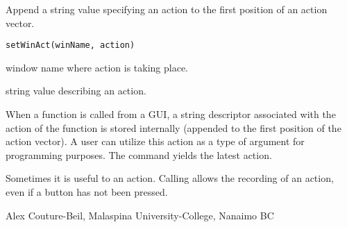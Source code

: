 \documentclass[letterpaper]{book}
\begin{document}
\begin{Description}\relax
Append a string value specifying an action to the first position of an 
action vector.
\end{Description}
\begin{Usage}
\begin{verbatim}
setWinAct(winName, action)
\end{verbatim}
\end{Usage}
\begin{Arguments}
\begin{ldescription}
\item[\code{winName}] window name where action is taking place.
\item[\code{action}] string value describing an action.
\end{ldescription}
\end{Arguments}
\begin{Details}\relax
When a function is called from a GUI, a string descriptor associated with 
the action of the function is stored internally (appended to the first position 
of the action vector). A user can utilize this action as a type of argument 
for programming purposes. The command  yields the latest action.

Sometimes it is useful to  an action. Calling  allows 
the recording of an action, even if a button has not been pressed.
\end{Details}
\begin{Author}\relax
Alex Couture-Beil, Malaspina University-College, Nanaimo BC
\end{Author}
\end{document}
